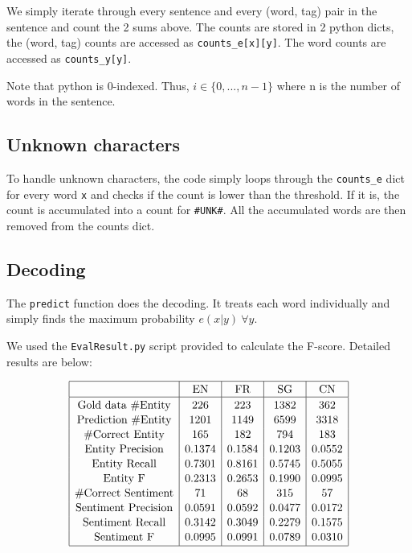 \documentclass[12pt]{article}
\begin{document}
We simply iterate through every sentence and every (word, tag) pair in the sentence and count the 2 sums above.
The counts are stored in 2 python dicts, the (word, tag) counts are accessed as \verb|counts_e[x][y]|. The word counts are accessed as \verb|counts_y[y]|.

Note that python is 0-indexed. Thus, \(i \in \{0,...,n-1\}\) where n is the number of words in the sentence.

\subsection{Unknown characters}

To handle unknown characters, the code simply loops through the \verb|counts_e| dict for every word \texttt{x} and checks if the count is lower than the threshold. If it is, the count is accumulated into a count for \texttt{\#UNK\#}. All the accumulated words are then removed from the counts dict.

\subsection{Decoding}

The \texttt{predict} function does the decoding. It treats each word individually and simply finds the maximum probability \( e(x|y) \ \forall y \).

We used the \texttt{EvalResult.py} script provided to calculate the F-score. Detailed results are below:

\[
\begin{array}{|c|c|c|c|c|}
\hline \rule{0pt}{1em}
& \mbox{EN} & \mbox{FR} & \mbox{SG} & \mbox{CN} \\
\hline \rule{0pt}{1em}
\mbox{Gold data \#Entity}  & 226    & 223    & 1382   & 362   \\[0.1em]
\mbox{Prediction \#Entity} & 1201   & 1149   & 6599   & 3318  \\[0.1em]
\mbox{\#Correct Entity}    & 165    & 182    & 794    & 183   \\[0.1em]
\mbox{Entity Precision}   & 0.1374 & 0.1584 & 0.1203 & 0.0552 \\[0.1em]
\mbox{Entity Recall}      & 0.7301 & 0.8161 & 0.5745 & 0.5055 \\[0.1em]
\mbox{Entity F}           & 0.2313 & 0.2653 & 0.1990 & 0.0995 \\[0.1em]
\mbox{\#Correct Sentiment} & 71     & 68     & 315    & 57    \\[0.1em]
\mbox{Sentiment Precision}& 0.0591 & 0.0592 & 0.0477 & 0.0172 \\[0.1em]
\mbox{Sentiment Recall}   & 0.3142 & 0.3049 & 0.2279 & 0.1575 \\[0.1em]
\mbox{Sentiment F}        & 0.0995 & 0.0991 & 0.0789 & 0.0310 \\[0.1em] 
\hline
\end{array}
\]
\end{document}
